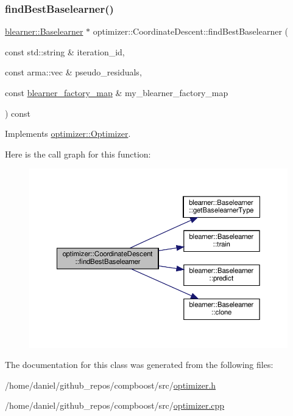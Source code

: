 \subsubsection{\texorpdfstring{find\+Best\+Baselearner()}{findBestBaselearner()}}
{\footnotesize\ttfamily \hyperlink{classblearner_1_1_baselearner}{blearner\+::\+Baselearner} $\ast$ optimizer\+::\+Coordinate\+Descent\+::find\+Best\+Baselearner (\begin{DoxyParamCaption}\item[{const std\+::string \&}]{iteration\+\_\+id,  }\item[{const arma\+::vec \&}]{pseudo\+\_\+residuals,  }\item[{const \hyperlink{baselearner__factory__list_8h_a058570e00ae11b882cfed36eb40be025}{blearner\+\_\+factory\+\_\+map} \&}]{my\+\_\+blearner\+\_\+factory\+\_\+map }\end{DoxyParamCaption}) const\hspace{0.3cm}{\ttfamily [virtual]}}



Implements \hyperlink{classoptimizer_1_1_optimizer_a134c7b34ed868231fbab53e9ebfa8fd8}{optimizer\+::\+Optimizer}.

Here is the call graph for this function\+:\nopagebreak
\begin{figure}[H]
\begin{center}
\leavevmode
\includegraphics[width=350pt]{classoptimizer_1_1_coordinate_descent_af5e8a9fb18b1f627b20534b372d62a6e_cgraph}
\end{center}
\end{figure}


The documentation for this class was generated from the following files\+:\begin{DoxyCompactItemize}
\item 
/home/daniel/github\+\_\+repos/compboost/src/\hyperlink{optimizer_8h}{optimizer.\+h}\item 
/home/daniel/github\+\_\+repos/compboost/src/\hyperlink{optimizer_8cpp}{optimizer.\+cpp}\end{DoxyCompactItemize}
